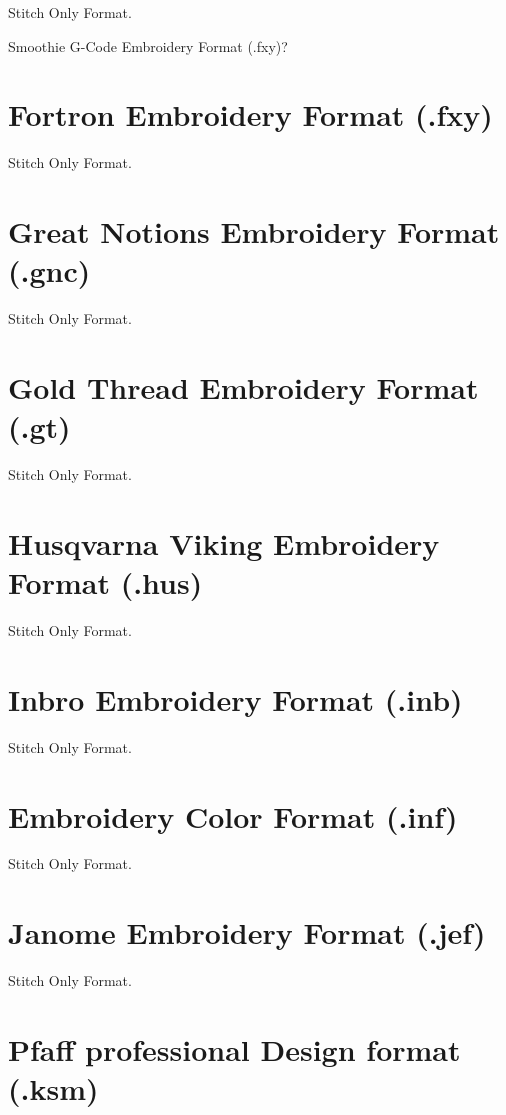 Stitch Only Format.

Smoothie G-Code Embroidery Format (.fxy)?

\section{Fortron Embroidery Format (.fxy)}

Stitch Only Format.

\section{Great Notions Embroidery Format (.gnc)}

Stitch Only Format.

\section{Gold Thread Embroidery Format (.gt)}

Stitch Only Format.

\section{Husqvarna Viking Embroidery Format (.hus)}

Stitch Only Format.

\section{Inbro Embroidery Format (.inb)}

Stitch Only Format.

\section{Embroidery Color Format (.inf)}

Stitch Only Format.

\section{Janome Embroidery Format (.jef)}

Stitch Only Format.

\section{Pfaff professional Design format (.ksm)}

